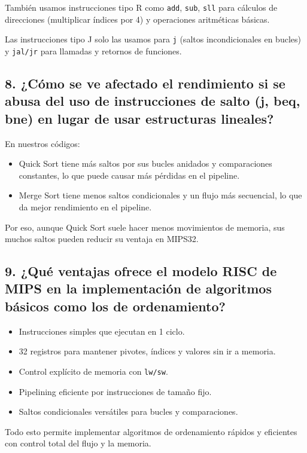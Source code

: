 \documentclass[12pt]{article}
\begin{document}
También usamos instrucciones tipo R como \texttt{add}, \texttt{sub}, \texttt{sll} para cálculos de direcciones (multiplicar índices por 4) y operaciones aritméticas básicas.

Las instrucciones tipo J solo las usamos para \texttt{j} (saltos incondicionales en bucles) y \texttt{jal/jr} para llamadas y retornos de funciones.

\subsection*{8. ¿Cómo se ve afectado el rendimiento si se abusa del uso de instrucciones de salto (j, beq, bne) en lugar de usar estructuras lineales?}

En nuestros códigos:

\begin{itemize}
    \item Quick Sort tiene más saltos por sus bucles anidados y comparaciones constantes, lo que puede causar más pérdidas en el pipeline.
    \item Merge Sort tiene menos saltos condicionales y un flujo más secuencial, lo que da mejor rendimiento en el pipeline.
\end{itemize}

Por eso, aunque Quick Sort suele hacer menos movimientos de memoria, sus muchos saltos pueden reducir su ventaja en MIPS32.

\subsection*{9. ¿Qué ventajas ofrece el modelo RISC de MIPS en la implementación de algoritmos básicos como los de ordenamiento?}

\begin{itemize}
    \item Instrucciones simples que ejecutan en 1 ciclo.
    \item 32 registros para mantener pivotes, índices y valores sin ir a memoria.
    \item Control explícito de memoria con \texttt{lw/sw}.
    \item Pipelining eficiente por instrucciones de tamaño fijo.
    \item Saltos condicionales versátiles para bucles y comparaciones.
\end{itemize}

Todo esto permite implementar algoritmos de ordenamiento rápidos y eficientes con control total del flujo y la memoria.
\end{document}

